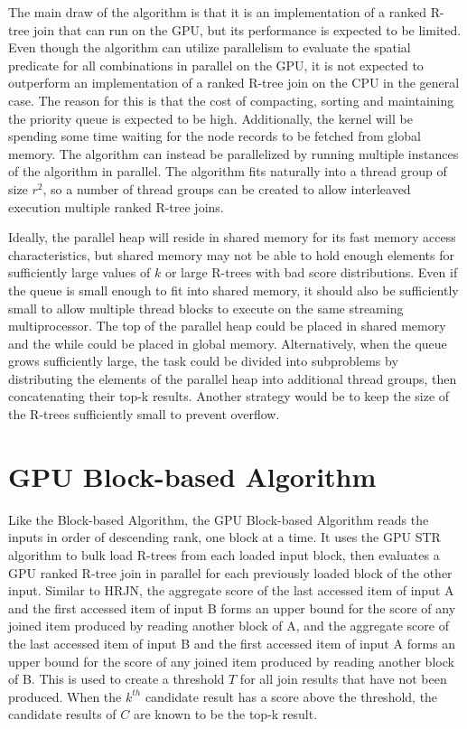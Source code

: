 The main draw of the algorithm is that it is an implementation of a ranked R-tree join that can run on the GPU, but its performance is expected to be limited. Even though the algorithm can utilize parallelism to evaluate the spatial predicate for all combinations in parallel on the GPU, it is not expected to outperform an implementation of a ranked R-tree join on the CPU in the general case. The reason for this is that the cost of compacting, sorting and maintaining the priority queue is expected to be high. Additionally, the kernel will be spending some time waiting for the node records to be fetched from global memory. The algorithm can instead be parallelized by running multiple instances of the algorithm in parallel. The algorithm fits naturally into a thread group of size \(r^2\), so a number of thread groups can be created to allow interleaved execution multiple ranked R-tree joins.

Ideally, the parallel heap will reside in shared memory for its fast memory access characteristics, but shared memory may not be able to hold enough elements for sufficiently large values of \(k\) or large R-trees with bad score distributions. Even if the queue is small enough to fit into shared memory, it should also be sufficiently small to allow multiple thread blocks to execute on the same streaming multiprocessor. The top of the parallel heap could be placed in shared memory and the while could be placed in global memory. Alternatively, when the queue grows sufficiently large, the task could be divided into subproblems by distributing the elements of the parallel heap into additional thread groups, then concatenating their top-k results. Another strategy would be to keep the size of the R-trees sufficiently small to prevent overflow.

\section{GPU Block-based Algorithm}

Like the Block-based Algorithm, the GPU Block-based Algorithm reads the inputs in order of descending rank, one block at a time. It uses the GPU STR algorithm to bulk load R-trees from each loaded input block, then evaluates a GPU ranked R-tree join in parallel for each previously loaded block of the other input. Similar to HRJN, the aggregate score of the last accessed item of input A and the first accessed item of input B forms an upper bound for the score of any joined item produced by reading another block of A, and the aggregate score of the last accessed item of input B and the first accessed item of input A forms an upper bound for the score of any joined item produced by reading another block of B. This is used to create a threshold \(T\) for all join results that have not been produced. When the \(k^{th}\) candidate result has a score above the threshold, the candidate results of \(C\) are known to be the top-k result.

